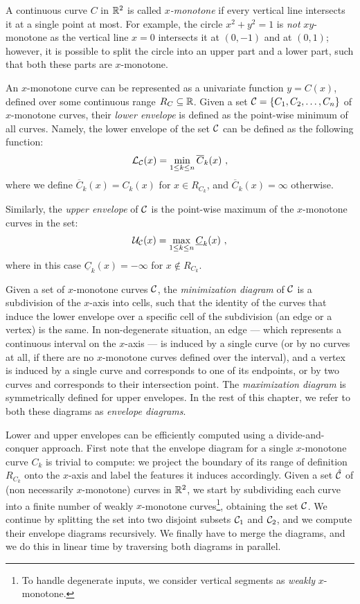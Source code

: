 
A continuous curve $C$ in $\mathbb{R}^2$ is called {\em $x$-monotone} if
every vertical line intersects it at a single point at most. For
example, the circle $x^2 + y^2 = 1$ is {\em not} $xy$-monotone as the
vertical line $x = 0$ intersects it at $(0, -1)$ and at $(0, 1)$;
however, it is possible to split the circle into an upper part and a
lower part, such that both these parts are $x$-monotone.

An $x$-monotone curve can be represented as a univariate function
$y = C(x)$, defined over some continuous range $R_C \subseteq \mathbb{R}$.
Given a set ${\cal C} = \{ C_1, C_2, \ldots, C_n \}$ of $x$-monotone
curves, their {\em lower envelope} is defined as the point-wise minimum of
all curves. Namely, the lower envelope of the set ${\cal C}$ can be
defined as the following function:
\begin{eqnarray*}
{\cal L}_{{\cal C}} (x) = \min_{1 \leq k \leq n}{\overline{C}_k (x)} \ ,
\end{eqnarray*}
where we define $\overline{C}_k(x) = C_k(x)$ for $x \in R_{C_k}$,
and $\overline{C}_k(x) = \infty$ otherwise.

Similarly, the {\em upper envelope} of ${\cal C}$ is the point-wise maximum of
the $x$-monotone curves in the set:
\begin{eqnarray*}
{\cal U}_{{\cal C}} (x) = \max_{1 \leq k \leq n}{\underline{C}_k (x)} \ ,
\end{eqnarray*}
where in this case $\underline{C}_k(x) = -\infty$ for $x 
\not\in R_{C_k}$.

Given a set of $x$-monotone curves ${\cal C}$, the {\em minimization
diagram} of ${\cal C}$ is a subdivision of the $x$-axis into cells,
such that the identity of the curves that induce the lower envelope
over a specific cell of the subdivision (an edge or a vertex) is the
same. In non-degenerate situation, an edge --- which represents a
continuous interval on the $x$-axis --- is induced by a single
curve (or by no curves at all, if there are no $x$-monotone curves
defined over the interval), and a vertex is induced by a single curve
and corresponds to one of its endpoints, or by two curves and
corresponds to their intersection point.
The {\em maximization diagram} is symmetrically defined for upper envelopes.
In the rest of this chapter, we refer to both these diagrams as
{\em envelope diagrams}.

Lower and upper envelopes can be efficiently computed using a
divide-and-conquer approach. First note that the envelope diagram for
a single $x$-monotone curve $C_k$ is trivial to compute: we project
the boundary of its range of definition $R_{C_k}$ onto the $x$-axis
and label the features it induces accordingly. Given a set
$\hat{{\cal C}}$ of (non necessarily $x$-monotone) curves in $\mathbb{R}^2$,
we start by subdividing each curve into a finite number of weakly
$x$-monotone curves\footnote{To handle degenerate inputs, we consider
vertical segments as {\em weakly} $x$-monotone.}, obtaining the set
${\cal C}$. We continue by splitting the set into two disjoint subsets
${\cal C}_1$ and ${\cal C}_2$, and we compute their envelope diagrams
recursively. We finally have to merge the diagrams, and we do this in
linear time by traversing both diagrams in parallel.

